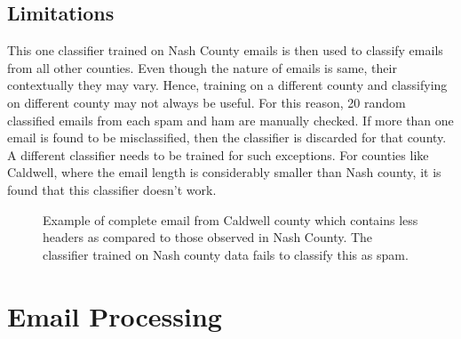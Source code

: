 \documentclass[fleqn]{MJDArticle}
\begin{document}
\subsection{Limitations}
This one classifier trained on Nash County emails is then used to classify emails from all other counties. Even though the nature of emails is same, their contextually they may vary. Hence, training on a different county and classifying on different county may not always be useful. For this reason, 20 random classified emails from each spam and ham are manually checked. If more than one email is found to be misclassified, then the classifier is discarded for that county. A different classifier needs to be trained for such exceptions.  For counties like Caldwell, where the email length is considerably smaller than Nash county, it is found that this classifier doesn't work.

\begin{center}
	\begin{figure}[ht]
		\centering
		\caption{\label{fig:spamemail} Example of complete email from Caldwell county which contains less headers as compared to those observed in Nash County. The classifier trained on Nash county data fails to classify this as spam.}
\cprotect{}
	\end{figure}
\end{center} 


\section{Email Processing}
 
\end{document}
